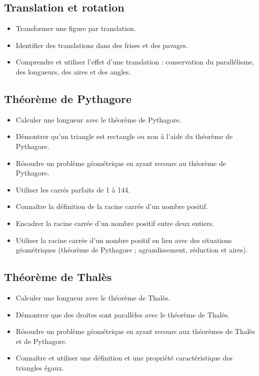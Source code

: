 \documentclass[a4paper,12pt,fleqn]{article}	
\begin{document}
\renewcommand{\labelitemi}{}

\subsection*{Translation et rotation}

\begin{itemize}
	\item {}Transformer une figure par translation.
	\item {}Identifier des translations dans des frises et des pavages.
	\item {}Comprendre et utiliser l’effet d’une translation : conservation du parallélisme, des longueurs, des aires et des angles.
\end{itemize}

\subsection*{Théorème de Pythagore}

\begin{itemize}
	\item {}Calculer une longueur avec le théorème de Pythagore.
	\item {}Démontrer qu'un triangle est rectangle ou non à l'aide du théorème de Pythagore.
	\item {}Résoudre un problème géométrique en ayant recours au théorème de Pythagore.
	\item {}Utiliser les carrés parfaits de 1 à 144.
	\item {}Connaître la définition de la racine carrée d’un nombre positif.
	\item {}Encadrer la racine carrée d’un nombre positif entre deux entiers.%
	\item {}Utiliser la racine carrée d’un nombre positif en lien avec des situations géométriques (théorème de Pythagore ; agrandissement, réduction et aires).
\end{itemize}

\subsection*{Théorème de Thalès}

\begin{itemize}
	\item {}Calculer une longueur avec le théorème de Thalès.
	\item {}Démontrer que des droites sont parallèles avec le théorème de Thalès.
	\item {}Résoudre un problème géométrique en ayant recours aux théorèmes de Thalès et de Pythagore.
	\item {}Connaître et utiliser une définition et une propriété caractéristique des triangles égaux.
\end{itemize}
\end{document}
